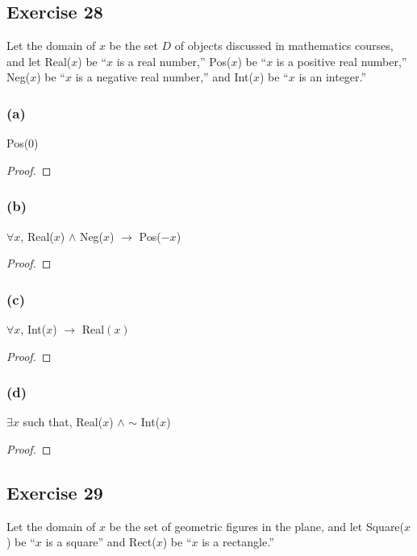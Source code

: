 \documentclass[14pt]{extarticle}
\newcommand{\fa}{\forall}
\newcommand{\te}{\exists}
\begin{document}
\subsection{Exercise 28}
Let the domain of $x$ be the set $D$ of objects discussed in mathematics courses, and let Real($x$) be “$x$ is a real number,” Pos($x$) be “$x$ is a positive real number,” Neg($x$) be “$x$ is a negative real number,” and Int($x$) be “$x$ is an integer.”

\subsubsection{(a)}
Pos(0)

\begin{proof}

\end{proof}

\subsubsection{(b)}
$\fa x$, Real($x$) $\wedge$ Neg($x$) $\to$ Pos($-x$)

\begin{proof}

\end{proof}

\subsubsection{(c)}
$\fa x$, Int($x$) $\to$ Real$(x)$

\begin{proof}

\end{proof}

\subsubsection{(d)}
$\te x$ such that, Real($x$) $\wedge$ $\sim$ Int($x$) 

\begin{proof}

\end{proof}

\subsection{Exercise 29}
Let the domain of $x$ be the set of geometric figures in the plane, and let Square($x$) be “$x$ is a square” and Rect($x$) be “$x$ is a rectangle.”
\end{document}
